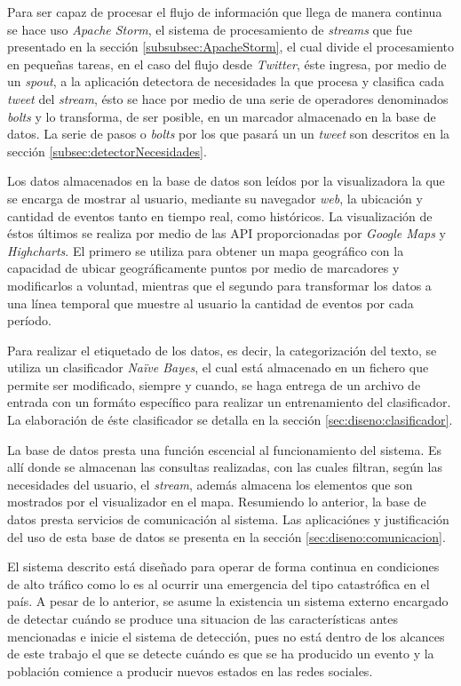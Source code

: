Para ser capaz de procesar el flujo de información que llega de manera continua se hace uso \textit{Apache Storm}, el sistema de procesamiento de \textit{streams} que fue presentado en la sección \ref{subsubsec:ApacheStorm}, el cual divide el procesamiento en pequeñas tareas, en el caso del flujo desde \textit{Twitter}, éste ingresa, por medio de un \textit{spout}, a la aplicación detectora de necesidades la que procesa y clasifica cada \textit{tweet} del \textit{stream}, ésto se hace por medio de una serie de operadores denominados \textit{bolts} y lo transforma, de ser posible, en un marcador almacenado en la base de datos. La serie de pasos o \textit{bolts} por los que pasará un un \textit{tweet} son descritos en la sección \ref{subsec:detectorNecesidades}.

Los datos almacenados en la base de datos son leídos por la visualizadora la que se encarga de mostrar al usuario, mediante su navegador \textit{web}, la ubicación y cantidad de eventos tanto en tiempo real, como históricos. La visualización de éstos últimos se realiza por medio de las API proporcionadas por \textit{Google Maps} y \textit{Highcharts}. El primero se utiliza para obtener un mapa geográfico con la capacidad de ubicar geográficamente puntos por medio de marcadores y modificarlos a voluntad, mientras que el segundo para transformar los datos a una línea temporal que muestre al usuario la cantidad de eventos por cada período.

Para realizar el etiquetado de los datos, es decir, la categorización del texto, se utiliza un clasificador \textit{Naïve Bayes}, el cual está almacenado en un fichero que permite ser modificado, siempre y cuando, se haga entrega de un archivo de entrada con un formáto específico para realizar un entrenamiento del clasificador. La elaboración de éste clasificador se detalla en la sección \ref{sec:diseno:clasificador}.

La base de datos presta una función escencial al funcionamiento del sistema. Es allí donde se almacenan las consultas realizadas, con las cuales filtran, según las necesidades del usuario, el \textit{stream}, además almacena los elementos que son mostrados por el visualizador en el mapa. Resumiendo lo anterior, la base de datos presta servicios de comunicación al sistema. Las aplicaciónes y justificación del uso de esta base de datos se presenta en la sección \ref{sec:diseno:comunicacion}.

El sistema descrito está diseñado para operar de forma continua en condiciones de alto tráfico como lo es al ocurrir una emergencia del tipo catastrófica en el país. A pesar de lo anterior, se asume la existencia un sistema externo encargado de detectar cuándo se produce una situacion de las características antes mencionadas e inicie el sistema de detección, pues no está dentro de los alcances de este trabajo el que se detecte cuándo es que se ha producido un evento y la población comience a producir nuevos estados en las redes sociales.

